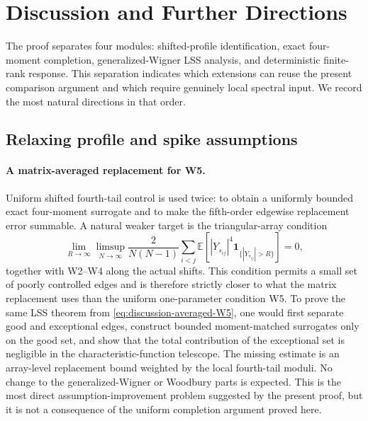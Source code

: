 \documentclass[10pt,a4paper]{amsart}
\newcommand{\E}{\mathbb E}
\newcommand{\one}{\mathbf 1}
\begin{document}
\section{Discussion and Further Directions}\label{sec:discussion}

The proof separates four modules: shifted-profile identification, exact
four-moment completion, generalized-Wigner LSS analysis, and deterministic
finite-rank response.  This separation indicates which extensions can reuse
the present comparison argument and which require genuinely local spectral
input.  We record the most natural directions in that order.

\subsection{Relaxing profile and spike assumptions}
\label{subsec:discussion-assumptions}

\paragraph*{A matrix-averaged replacement for W5.}
Uniform shifted fourth-tail control is used twice: to obtain a uniformly
bounded exact four-moment surrogate and to make the fifth-order edgewise
replacement error summable.  A natural weaker target is the triangular-array
condition
\begin{equation}\label{eq:discussion-averaged-W5}
 \lim_{R\to\infty}\limsup_{N\to\infty}
 \frac{2}{N(N-1)}\sum_{i<j}
 \E\left[|Y_{s_{ij}}|^4
 \one_{\{|Y_{s_{ij}}|>R\}}\right]=0,
\end{equation}
together with W2--W4 along the actual shifts.  This condition permits a small
set of poorly controlled edges and is therefore strictly closer to what the
matrix replacement uses than the uniform one-parameter condition W5.  To
prove the same LSS theorem from \eqref{eq:discussion-averaged-W5}, one would
first separate good and exceptional edges, construct bounded moment-matched
surrogates only on the good set, and show that the total contribution of the
exceptional set is negligible in the characteristic-function telescope.  The
missing estimate is an array-level replacement bound weighted by the local
fourth-tail moduli.  No change to the generalized-Wigner or Woodbury parts is
expected.  This is the most direct assumption-improvement problem suggested
by the present proof, but it is not a consequence of the uniform completion
argument proved here.
\end{document}
